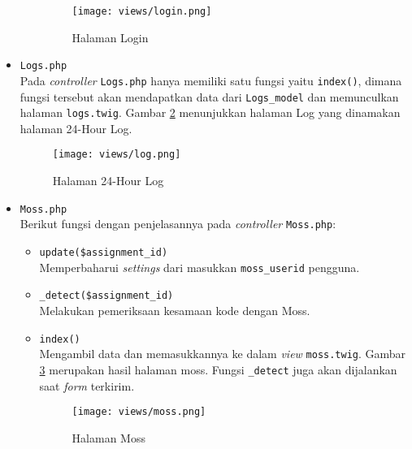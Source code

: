 \begin{itemize}
\begin{itemize}
		            \begin{figure}[H]
			            \centering
			            \texttt{[image: views/login.png]}
			            \caption{Halaman Login}
			            \label{fig:3:1:1:login}
		            \end{figure}

	      \end{itemize}

	\item \verb|Logs.php| \\
	      Pada \textit{controller} \verb|Logs.php| hanya memiliki satu fungsi yaitu \verb|index()|, dimana fungsi tersebut akan mendapatkan data dari \verb|Logs_model| dan memunculkan halaman \verb|logs.twig|. Gambar \ref{fig:3:1:1:log} menunjukkan halaman Log yang dinamakan halaman 24-Hour Log.

	      \begin{figure}[H]
		      \centering
		      \texttt{[image: views/log.png]}
		      \caption{Halaman 24-Hour Log}
		      \label{fig:3:1:1:log}
	      \end{figure}


	\item \verb|Moss.php| \\
	      Berikut fungsi dengan penjelasannya pada \textit{controller} \verb|Moss.php|:

	      \begin{itemize}
		      \item \verb|update($assignment_id)| \\
		            Memperbaharui \textit{settings} dari masukkan \verb|moss_userid| pengguna.
		      \item \verb|_detect($assignment_id)| \\
		            Melakukan pemeriksaan kesamaan kode dengan Moss.
		      \item \verb|index()| \\
		            Mengambil data dan memasukkannya ke dalam \textit{view} \verb|moss.twig|. Gambar \ref{fig:3:1:1:moss} merupakan hasil halaman moss. Fungsi \verb|_detect| juga akan dijalankan saat \textit{form} terkirim.

		            \begin{figure}[H]
			            \centering
			            \texttt{[image: views/moss.png]}
			            \caption{Halaman Moss}
			            \label{fig:3:1:1:moss}
		            \end{figure}


\end{itemize}
\end{itemize}
